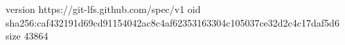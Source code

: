 version https://git-lfs.github.com/spec/v1
oid sha256:caf432191d69cd91154042ac8c4af62353163304c105037ce32d2c4c17daf5d6
size 43864
